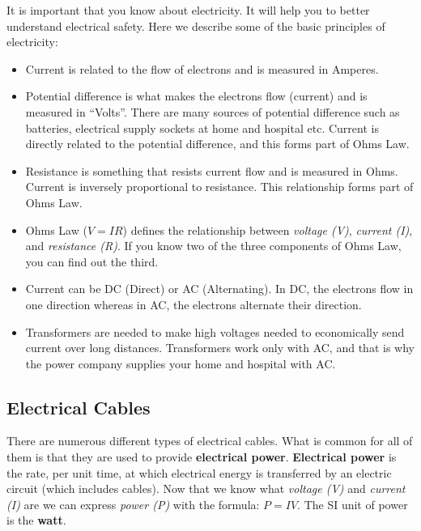 \documentclass[14pt]{article} %
\begin{document}
It is important that you know about electricity. It will help you to better understand electrical safety. Here we describe some of the basic principles of electricity:

\begin{itemize}

\item Current is related to the flow of electrons and is measured in Amperes.

\item Potential difference is what makes the electrons flow (current) and is measured in “Volts”. There are many sources of potential difference such as batteries, electrical supply sockets at home and hospital etc. Current is directly related to the potential difference, and this forms part of Ohms Law.

\item Resistance is something that resists current flow and is measured in Ohms. Current is inversely proportional to resistance. This relationship forms part of Ohms Law.

\item Ohms Law (\textbf{$V = I R$}) defines the relationship between \textit{voltage (V)}, \textit{current (I)}, and \textit{resistance (R)}. If you know two of the three components of Ohms Law, you can find out the third.

\item Current can be DC (Direct) or AC (Alternating). In DC, the electrons flow in one direction whereas in AC, the electrons alternate their direction.

\item Transformers are needed to make high voltages needed to economically send current over long distances. Transformers work only with AC, and that is why the power company supplies your home and hospital with AC.

\end{itemize}

\subsection{Electrical Cables}
\label{electrical-cables}
There are numerous different types of electrical cables. What is common for all of them is that they are used to provide \textbf{electrical power}. \textbf{Electrical power} is the rate, per unit time, at which electrical energy is transferred by an electric circuit (which includes cables). Now that we know what \textit{voltage (V)} and \textit{current (I)} are we can express \textit{power (P)} with the formula: \textbf{$P = I V$}. The SI unit of power is the \textbf{watt}. 
\end{document}
